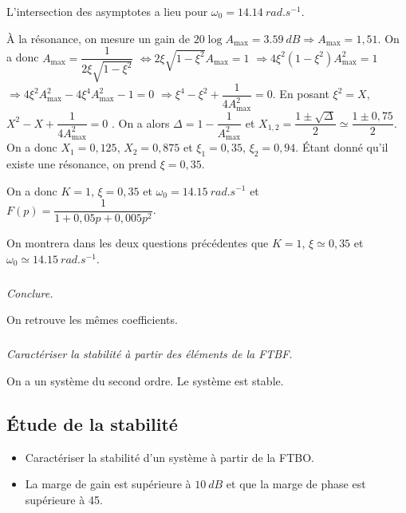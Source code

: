 \documentclass[10pt,fleqn]{article} %
\begin{document}
\begin{multicols}{2}
\begin{corrige}
L'intersection des asymptotes a lieu pour $\omega_0=\SI{14,14}{rad.s^{-1}}$. 

À la résonance, on mesure un gain de $20\log A_{\text{max}}=\SI{3,59}{dB}\Rightarrow A_{\text{max}}=1,51$. On a donc 
$A_{\text{max}} = \dfrac{1}{2\xi\sqrt{1-\xi^2}}$
$\Leftrightarrow {2\xi\sqrt{1-\xi^2}}A_{\text{max}}=1$
$\Rightarrow 4\xi^2\left(1-\xi^2\right)A_{\text{max}}^2=1 $
$\Rightarrow 4\xi^2A_{\text{max}}^2 -4\xi^4 A_{\text{max}}^2-1=0 $
$\Rightarrow \xi^4 - \xi^2 +\dfrac{1}{4A_{\text{max}}^2}=0 $. En posant $\xi^2=X$,  
$ X^2 - X +\dfrac{1}{4A_{\text{max}}^2}=0 $
. On a alors $\Delta = 1-\dfrac{1}{A_{\text{max}}^2}$ et $X_{1,2}=\dfrac{1\pm \sqrt{\Delta}}{2}\simeq \dfrac{1\pm 0,75}{2}$. On a donc $X_1=0,125$, $X_2=0,875$ et $\xi_1=0,35$, $\xi_2=0,94$. Étant donné qu'il existe une résonance, on prend $\xi=0,35$.

 On a donc $K=1$, $\xi=0,35$ et $\omega_0=\SI{14,15}{rad.s^{-1}}$ et $F(p)=\dfrac{1}{1+0,05p+0,005p^2}$.

\end{corrige}
\else
\fi

\begin{rem}
On montrera dans les deux questions précédentes que 
$K=1$, $\xi\simeq0,35$ et $\omega_0\simeq\SI{14,15}{rad.s^{-1}}$.
\end{rem}

\subparagraph{}\textit{Conclure.}
\ifprof
\begin{corrige}
On retrouve les mêmes coefficients. 
\end{corrige}
\else
\fi

\subparagraph{}\textit{Caractériser la stabilité à partir des éléments de la FTBF.}



\ifprof
\begin{corrige}
On a un système du second ordre. Le système est stable. 
\end{corrige}
\else
\fi

\subsection*{Étude de la stabilité}

\begin{obj}
\begin{itemize}
\item Caractériser la stabilité d'un système à partir de la FTBO.
\item La marge de gain est supérieure à $\SI{10}{dB}$ et que la marge de phase est supérieure à \SI{45}{\degres}.
\end{itemize}


\end{obj}
\end{multicols}
\end{document}

